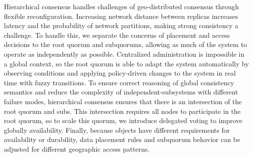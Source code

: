 \documentclass[10pt,conference]{IEEEtran}
\newcommand{\hc}{hierarchical consensus\xspace}
\newcommand{\Hc}{Hierarchical consensus\xspace}
\newcommand{\subs}{subquorums\xspace}
\newcommand{\roo}{root quorum\xspace}
\begin{document}
\Hc handles challenges of geo-distributed consensus through flexible reconfiguration.
Increasing network distance between replicas increases latency and the probability of
network partitions, making strong consistency a challenge.
To handle this, we separate the concerns of placement and access decisions to the \roo
and \subs, allowing as much of the system to operate as independently as possible.
Centralized administration is impossible in a global context, so the \roo is able to
adapt the system automatically by observing conditions and applying policy-driven
changes to the system in real time with fuzzy transitions.
To ensure correct reasoning of global consistency semantics and reduce the complexity of
independent-subsystems with different failure modes, \hc ensures that there is an
intersection of the \roo and subs.
This intersection requires all nodes to participate in the root quorum, so to scale
this quorum, we introduce delegated voting to improve globally availability.
Finally, because objects have different requirements for availability or durability,
data placement rules and subquorum behavior can be adjusted for different geographic
access patterns.





\end{document}
